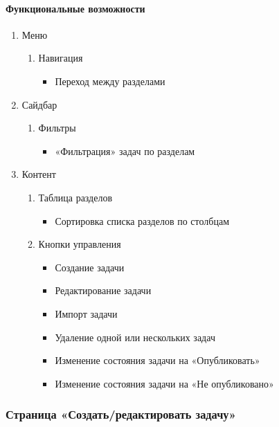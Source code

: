 \paragraph{Функциональные возможности}
\begin{enumerate}
	\item Меню
	\begin{enumerate}
		\item Навигация
		\begin{itemize}
			\item Переход между разделами
		\end{itemize}
	\end{enumerate}

	\item Сайдбар
	\begin{enumerate}
		\item Фильтры
		\begin{itemize}
			\item «Фильтрация» задач по разделам
		\end{itemize}
	\end{enumerate}

	\item Контент
	\begin{enumerate}
		\item Таблица разделов
		\begin{itemize}
			\item Сортировка списка разделов по столбцам
		\end{itemize}

		\item Кнопки управления
		\begin{itemize}
			\item Создание задачи
			\item Редактирование задачи
			\item Импорт задачи
			\item Удаление одной или нескольких задач
			\item Изменение состояния задачи на «Опубликовать»
			\item Изменение состояния задачи на «Не опубликовано»
		\end{itemize}
	\end{enumerate}
\end{enumerate}

\subsubsection{Страница «Создать/редактировать задачу»}

